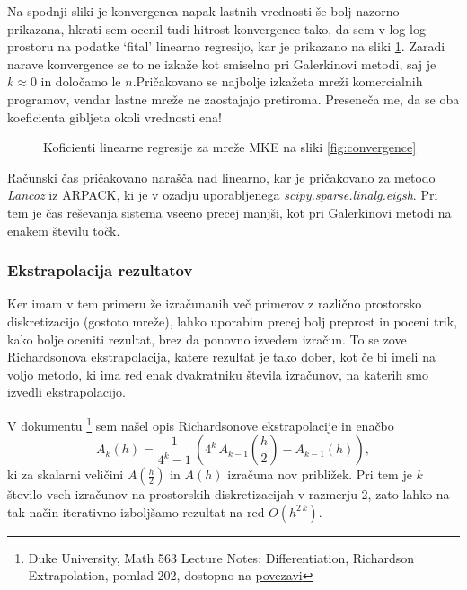 
Na spodnji sliki je konvergenca napak lastnih vrednosti še bolj nazorno prikazana, hkrati sem ocenil tudi hitrost konvergence tako, da sem v log-log prostoru na podatke `fital' linearno regresijo, kar je prikazano na sliki \ref{fig:linfit}. Zaradi narave konvergence se to ne izkaže kot smiselno pri Galerkinovi metodi, saj je $k\approx 0$ in določamo le $n$.Pričakovano se najbolje izkažeta mreži komercialnih programov, vendar lastne mreže ne zaostajajo pretiroma. Preseneča me, da se oba koeficienta gibljeta okoli vrednosti ena!


\begin{figure}[H]
    \centering
    \caption{Koficienti linearne regresije za mreže MKE na sliki \ref{fig:convergence}}\label{fig:linfit}
\end{figure}

Računski čas pričakovano narašča nad linearno, kar je pričakovano za metodo \textit{Lancoz} iz ARPACK, ki je v ozadju uporabljenega \textit{scipy.sparse.linalg.eigsh}. Pri tem je čas reševanja sistema vseeno precej manjši, kot pri Galerkinovi metodi na enakem številu točk.


\subsubsection{Ekstrapolacija rezultatov}

Ker imam v tem primeru že izračunanih več primerov z različno prostorsko diskretizacijo (gostoto mreže), lahko uporabim precej bolj preprost in poceni trik, kako bolje oceniti rezultat, brez da ponovno izvedem izračun. To se zove Richardsonova ekstrapolacija, katere rezultat je tako dober, kot če bi imeli na voljo metodo, ki ima red enak dvakratniku števila izračunov, na katerih smo izvedli ekstrapolacijo.

V dokumentu \footnote[1]{Duke University, Math 563 Lecture Notes: Differentiation, Richardson Extrapolation, pomlad 202, dostopno na \href{https://services.math.duke.edu/~jtwong/math563-2020/lectures/Lec2-derivatives.pdf}{povezavi}} sem našel opis Richardsonove ekstrapolacije in enačbo
\begin{equation}\label{eq:richardson_1}
    A_k(h) = \frac{1}{4^k-1} \, \left(4^k\,A_{k-1}\left(\frac{h}{2}\right) - A_{k-1}\left(h\right)\right),
\end{equation}
ki za skalarni veličini $A(\frac{h}{2})$ in $A(h)$ izračuna nov približek. Pri tem je $k$ število vseh izračunov na prostorskih diskretizacijah v razmerju 2, zato lahko na tak način iterativno izboljšamo rezultat na 
red $O(h^{2\,k})$.


